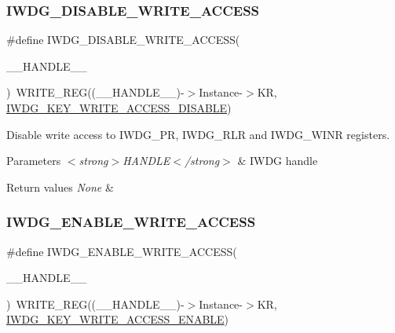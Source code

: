 \subsubsection{\texorpdfstring{I\+W\+D\+G\+\_\+\+D\+I\+S\+A\+B\+L\+E\+\_\+\+W\+R\+I\+T\+E\+\_\+\+A\+C\+C\+E\+SS}{IWDG\_DISABLE\_WRITE\_ACCESS}}
{\footnotesize\ttfamily \#define I\+W\+D\+G\+\_\+\+D\+I\+S\+A\+B\+L\+E\+\_\+\+W\+R\+I\+T\+E\+\_\+\+A\+C\+C\+E\+SS(\begin{DoxyParamCaption}\item[{}]{\+\_\+\+\_\+\+H\+A\+N\+D\+L\+E\+\_\+\+\_\+ }\end{DoxyParamCaption})~W\+R\+I\+T\+E\+\_\+\+R\+EG((\+\_\+\+\_\+\+H\+A\+N\+D\+L\+E\+\_\+\+\_\+)-\/$>$Instance-\/$>$KR, \hyperlink{group___i_w_d_g___private___constants_ga9e63bed9af448ad96c4621e74230a415}{I\+W\+D\+G\+\_\+\+K\+E\+Y\+\_\+\+W\+R\+I\+T\+E\+\_\+\+A\+C\+C\+E\+S\+S\+\_\+\+D\+I\+S\+A\+B\+LE})}



Disable write access to I\+W\+D\+G\+\_\+\+PR, I\+W\+D\+G\+\_\+\+R\+LR and I\+W\+D\+G\+\_\+\+W\+I\+NR registers. 


\begin{DoxyParams}{Parameters}
{\em $<$strong$>$\+H\+A\+N\+D\+L\+E$<$/strong$>$} & I\+W\+DG handle \\
\hline
\end{DoxyParams}

\begin{DoxyRetVals}{Return values}
{\em None} & \\
\hline
\end{DoxyRetVals}
\mbox{\label{group___i_w_d_g___private___macros_ga65cf77f3cfd45d3fd66c0cf33d23d7ab}} 
\subsubsection{\texorpdfstring{I\+W\+D\+G\+\_\+\+E\+N\+A\+B\+L\+E\+\_\+\+W\+R\+I\+T\+E\+\_\+\+A\+C\+C\+E\+SS}{IWDG\_ENABLE\_WRITE\_ACCESS}}
{\footnotesize\ttfamily \#define I\+W\+D\+G\+\_\+\+E\+N\+A\+B\+L\+E\+\_\+\+W\+R\+I\+T\+E\+\_\+\+A\+C\+C\+E\+SS(\begin{DoxyParamCaption}\item[{}]{\+\_\+\+\_\+\+H\+A\+N\+D\+L\+E\+\_\+\+\_\+ }\end{DoxyParamCaption})~W\+R\+I\+T\+E\+\_\+\+R\+EG((\+\_\+\+\_\+\+H\+A\+N\+D\+L\+E\+\_\+\+\_\+)-\/$>$Instance-\/$>$KR, \hyperlink{group___i_w_d_g___private___constants_ga90fbb0a5e42ed25b44c0330ad75724e6}{I\+W\+D\+G\+\_\+\+K\+E\+Y\+\_\+\+W\+R\+I\+T\+E\+\_\+\+A\+C\+C\+E\+S\+S\+\_\+\+E\+N\+A\+B\+LE})}



